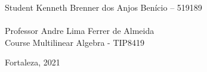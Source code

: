 \vspace{25pt}

\begin{flushleft}
	\begin{tabbing}
		Student \qquad Kenneth Brenner dos Anjos Benício – 519189\\
	   \qquad\qquad\qquad\= \\
		Professor\> Andre Lima Ferrer de Almeida \\
		Course \> Multilinear Algebra - TIP8419\\
	\end{tabbing}
\end{flushleft}

\vspace{25pt}

\begin{center}
    Fortaleza, 2021
\end{center}
